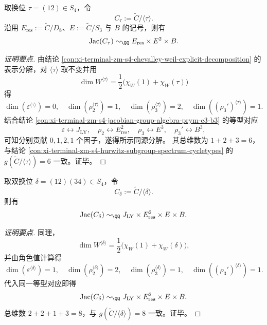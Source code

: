 \begin{conclusion}\label{con:xi-terminal-zm-s4-transposition-quotient-jacobian-full-decomposition}
取换位 \(\tau=(12)\in S_4\)，令
\[
C_{\tau}:=\widetilde{C}/\langle\tau\rangle.
\]
沿用 \(E_{\mathrm{res}}:=\widetilde{C}/D_8\)、\(E:=\widetilde{C}/S_3\) 与 \(B\) 的记号，则有
\[
\mathrm{Jac}(C_{\tau})\sim_{\QQ}E_{\mathrm{res}}\times E^2\times B.
\]
\end{conclusion}
\begin{proof}[证明要点]
由结论 \ref{con:xi-terminal-zm-s4-chevalley-weil-explicit-decomposition} 的表示分解，对 \(\langle\tau\rangle\) 取不变并用
\[
\dim W^{\langle\tau\rangle}=\frac12\bigl(\chi_W(1)+\chi_W(\tau)\bigr)
\]
得
\[
\dim(\varepsilon^{\langle\tau\rangle})=0,\quad
\dim(\rho_2^{\langle\tau\rangle})=1,\quad
\dim(\rho_3^{\langle\tau\rangle})=2,\quad
\dim((\rho_3')^{\langle\tau\rangle})=1.
\]
结合结论 \ref{con:xi-terminal-zm-s4-jacobian-group-algebra-prym-e3-b3} 的等型对应
\[
\varepsilon\leftrightarrow J_{\mathrm{LY}},\quad
\rho_2\leftrightarrow E_{\mathrm{res}}^2,\quad
\rho_3\leftrightarrow E^3,\quad
\rho_3'\leftrightarrow B^3,
\]
可知分别贡献 \(0,1,2,1\) 个因子，遂得所示同源分解。
其总维数为 \(1+2+3=6\)，与结论 \ref{con:xi-terminal-zm-s4-hurwitz-subgroup-spectrum-cycletypes} 的 \(g(\widetilde{C}/\langle\tau\rangle)=6\) 一致。证毕。
\end{proof}

\begin{conclusion}\label{con:xi-terminal-zm-s4-doubletransposition-quotient-jacobian-full-decomposition}
取双换位 \(\delta=(12)(34)\in S_4\)，令
\[
C_{\delta}:=\widetilde{C}/\langle\delta\rangle.
\]
则有
\[
\mathrm{Jac}(C_{\delta})\sim_{\QQ}J_{\mathrm{LY}}\times E_{\mathrm{res}}^2\times E\times B.
\]
\end{conclusion}
\begin{proof}[证明要点]
同理，
\[
\dim W^{\langle\delta\rangle}=\frac12\bigl(\chi_W(1)+\chi_W(\delta)\bigr),
\]
并由角色值计算得
\[
\dim(\varepsilon^{\langle\delta\rangle})=1,\quad
\dim(\rho_2^{\langle\delta\rangle})=2,\quad
\dim(\rho_3^{\langle\delta\rangle})=1,\quad
\dim((\rho_3')^{\langle\delta\rangle})=1.
\]
代入同一等型对应即得
\[
\mathrm{Jac}(C_{\delta})\sim_{\QQ}J_{\mathrm{LY}}\times E_{\mathrm{res}}^2\times E\times B.
\]
总维数 \(2+2+1+3=8\)，与
\(g(\widetilde{C}/\langle\delta\rangle)=8\)
一致。证毕。
\end{proof}

